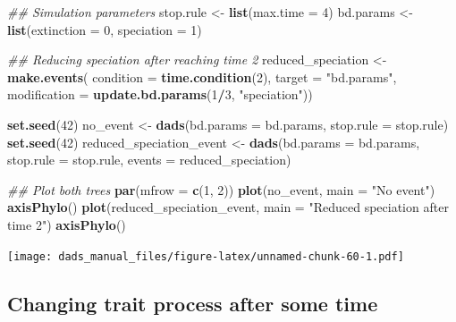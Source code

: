\documentclass[]{book}
\newenvironment{Shaded}{\begin{snugshade}}{\end{snugshade}}
\newcommand{\CommentTok}[1]{\textcolor[rgb]{0.56,0.35,0.01}{\textit{#1}}}
\newcommand{\DataTypeTok}[1]{\textcolor[rgb]{0.13,0.29,0.53}{#1}}
\newcommand{\DecValTok}[1]{\textcolor[rgb]{0.00,0.00,0.81}{#1}}
\newcommand{\KeywordTok}[1]{\textcolor[rgb]{0.13,0.29,0.53}{\textbf{#1}}}
\newcommand{\NormalTok}[1]{#1}
\newcommand{\OperatorTok}[1]{\textcolor[rgb]{0.81,0.36,0.00}{\textbf{#1}}}
\newcommand{\StringTok}[1]{\textcolor[rgb]{0.31,0.60,0.02}{#1}}
\begin{document}
\begin{Shaded}
\begin{Highlighting}[]
\CommentTok{## Simulation parameters}
\NormalTok{stop.rule <-}\StringTok{ }\KeywordTok{list}\NormalTok{(}\DataTypeTok{max.time =} \DecValTok{4}\NormalTok{)}
\NormalTok{bd.params <-}\StringTok{ }\KeywordTok{list}\NormalTok{(}\DataTypeTok{extinction =} \DecValTok{0}\NormalTok{, }\DataTypeTok{speciation =} \DecValTok{1}\NormalTok{)}

\CommentTok{## Reducing speciation after reaching time 2}
\NormalTok{reduced_speciation <-}\StringTok{ }\KeywordTok{make.events}\NormalTok{(}
                      \DataTypeTok{condition    =} \KeywordTok{time.condition}\NormalTok{(}\DecValTok{2}\NormalTok{),}
                      \DataTypeTok{target       =} \StringTok{"bd.params"}\NormalTok{,}
                      \DataTypeTok{modification =} \KeywordTok{update.bd.params}\NormalTok{(}\DecValTok{1}\OperatorTok{/}\DecValTok{3}\NormalTok{, }\StringTok{"speciation"}\NormalTok{))}

\KeywordTok{set.seed}\NormalTok{(}\DecValTok{42}\NormalTok{)}
\NormalTok{no_event <-}\StringTok{ }\KeywordTok{dads}\NormalTok{(}\DataTypeTok{bd.params =}\NormalTok{ bd.params,}
                 \DataTypeTok{stop.rule =}\NormalTok{ stop.rule)}
\KeywordTok{set.seed}\NormalTok{(}\DecValTok{42}\NormalTok{)}
\NormalTok{reduced_speciation_event <-}\StringTok{ }\KeywordTok{dads}\NormalTok{(}\DataTypeTok{bd.params =}\NormalTok{ bd.params,}
                                 \DataTypeTok{stop.rule =}\NormalTok{ stop.rule,}
                                 \DataTypeTok{events    =}\NormalTok{ reduced_speciation)}

\CommentTok{## Plot both trees}
\KeywordTok{par}\NormalTok{(}\DataTypeTok{mfrow =} \KeywordTok{c}\NormalTok{(}\DecValTok{1}\NormalTok{, }\DecValTok{2}\NormalTok{))}
\KeywordTok{plot}\NormalTok{(no_event, }\DataTypeTok{main =} \StringTok{"No event"}\NormalTok{)}
\KeywordTok{axisPhylo}\NormalTok{()}
\KeywordTok{plot}\NormalTok{(reduced_speciation_event, }\DataTypeTok{main =} \StringTok{"Reduced speciation after time 2"}\NormalTok{)}
\KeywordTok{axisPhylo}\NormalTok{()}
\end{Highlighting}
\end{Shaded}

\texttt{[image: dads\_manual\_files/figure-latex/unnamed-chunk-60-1.pdf]}

\hypertarget{changing-trait-process-after-some-time}{%
\subsection{Changing trait process after some time}\label{changing-trait-process-after-some-time}}
\end{document}
